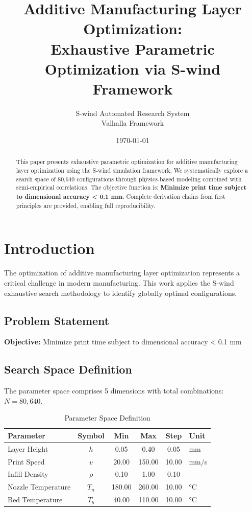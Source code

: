 \documentclass[11pt,twocolumn]{article}
\title{Additive Manufacturing Layer Optimization: \\Exhaustive Parametric Optimization via S-wind Framework}
\author{S-wind Automated Research System\\Valhalla Framework}
\date{\today}
\begin{document}
\maketitle

\begin{abstract}
This paper presents exhaustive parametric optimization for additive manufacturing layer optimization using the S-wind simulation framework.
We systematically explore a search space of 80,640 configurations through physics-based modeling
combined with semi-empirical correlations. The objective function is: \textbf{Minimize print time subject to dimensional accuracy < 0.1 mm}.
Complete derivation chains from first principles are provided, enabling full reproducibility.
\end{abstract}

\section{Introduction}
The optimization of additive manufacturing layer optimization represents a critical challenge in modern manufacturing.
This work applies the S-wind exhaustive search methodology to identify globally optimal configurations.

\subsection{Problem Statement}
\textbf{Objective:} Minimize print time subject to dimensional accuracy < 0.1 mm

\subsection{Search Space Definition}
The parameter space comprises 5 dimensions with total combinations: $N = 80,640$.

\begin{table}[h]
\centering
\caption{Parameter Space Definition}
\begin{tabular}{@{}lccccl@{}}
\toprule
Parameter & Symbol & Min & Max & Step & Unit \\
\midrule
Layer Height & $h$ & 0.05 & 0.40 & 0.05 & mm \\
Print Speed & $v$ & 20.00 & 150.00 & 10.00 & mm/s \\
Infill Density & $\rho$ & 0.10 & 1.00 & 0.10 &  \\
Nozzle Temperature & $T_n$ & 180.00 & 260.00 & 10.00 & °C \\
Bed Temperature & $T_b$ & 40.00 & 110.00 & 10.00 & °C \\
\bottomrule
\end{tabular}
\end{table}
\end{document}
